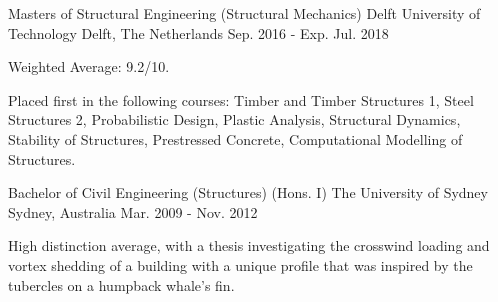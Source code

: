 

\begin{cventries}

    \cventry
    {Masters of Structural Engineering (Structural Mechanics)} %
    {Delft University of Technology} %
    {Delft, The Netherlands} %
    {Sep. 2016 - Exp. Jul. 2018} %
    {
      \begin{cvitems} %
        \item {Weighted Average: 9.2/10.}
        \item {Placed first in the following courses: Timber and Timber Structures 1, Steel Structures 2, Probabilistic Design, Plastic Analysis, Structural Dynamics, Stability of Structures, Prestressed Concrete, Computational Modelling of Structures.}
      \end{cvitems}
    }
    \cventry
    {Bachelor of Civil Engineering (Structures) (Hons. I)} %
    {The University of Sydney} %
    {Sydney, Australia} %
    {Mar. 2009 - Nov. 2012} %
    {
      \begin{cvitems} %
        \item {High distinction average, with a thesis investigating the crosswind loading and vortex shedding of a building with a unique profile that was inspired by the tubercles on a humpback whale's fin.}
      \end{cvitems}
    }

\end{cventries}
